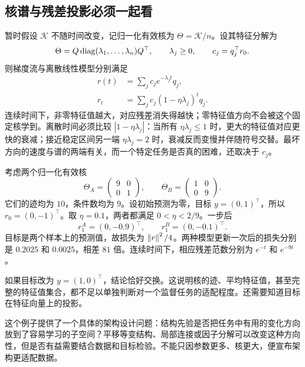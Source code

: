 \subsection{核谱与残差投影必须一起看}

暂时假设 $\mathcal K$ 不随时间改变，记归一化有效核为
$\Theta=\mathcal K/n$。设其特征分解为
\begin{equation}
 \Theta=Q\operatorname{diag}(\lambda_1,\ldots,\lambda_n)Q^\top,
 \qquad \lambda_j\geq0,
 \qquad c_j=q_j^\top r_0.
\end{equation}
则梯度流与离散线性模型分别满足
\begin{align}
 r(t)&=\sum_j c_j e^{-\lambda_jt}q_j,\label{l5:continuous-modes}\\
 r_t&=\sum_j c_j(1-\eta\lambda_j)^tq_j.\label{l5:discrete-modes}
\end{align}
连续时间下，非零特征值越大，对应残差消失得越快；零特征值方向不会被这个固定核学到。离散时间必须比较 $|1-\eta\lambda_j|$：当所有 $\eta\lambda_j\leq1$ 时，更大的特征值对应更快的衰减；接近稳定区间另一端 $\eta\lambda_j=2$ 时，衰减反而变慢并伴随符号交替。最坏方向的速度与谱的两端有关，而一个特定任务是否真的困难，还取决于 $c_j$。

\begin{example}
考虑两个归一化有效核
\[
 \Theta_A=\begin{pmatrix}9&0\\0&1\end{pmatrix},
 \qquad
 \Theta_B=\begin{pmatrix}1&0\\0&9\end{pmatrix}.
\]
它们的迹均为 $10$，条件数均为 $9$。设初始预测为零，目标 $y=(0,1)^\top$，所以 $r_0=(0,-1)^\top$。取 $\eta=0.1$，两者都满足 $0<\eta<2/9$。一步后
\[
 r_1^{A}=(0,-0.9)^\top,
 \qquad r_1^{B}=(0,-0.1)^\top.
\]
目标是两个样本上的预测值，故损失为 $\left\lVert r\right\rVert^2/4$。两种模型更新一次后的损失分别是 $0.2025$ 和 $0.0025$，相差 $81$ 倍。连续时间下，相应残差范数分别为 $e^{-t}$ 和 $e^{-9t}$。

如果目标改为 $y=(1,0)^\top$，结论恰好交换。这说明核的迹、平均特征值，甚至完整的特征值集合，都不足以单独判断对一个监督任务的适配程度。还需要知道目标在特征向量上的投影。
\end{example}

这个例子提供了一个具体的架构设计问题：结构先验是否把任务中有用的变化方向放到了容易学习的子空间？平移等变结构、局部连接或因子分解可以改变这种方向性，但是否有益需要结合数据和目标检验。不能只因参数更多、核更大，便宣布架构更适配数据。

